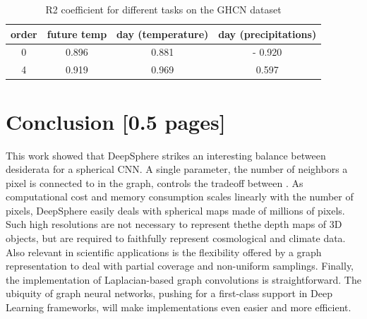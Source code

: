 \documentclass{article} %
\newcommand{\todo}[1]{{\color[rgb]{.6,.1,.6}{#1}}}
\begin{document}
\begin{table}
    \centering
    \begin{tabular}{c|ccc}
        order & future temp & day (temperature) & day (precipitations) \\ \hline
        0 & 0.896 & 0.881 & - 0.920\\
        4 & 0.919 & 0.969 & 0.597\\
    \end{tabular}
    \caption{R2 coefficient for different tasks on the GHCN dataset}
    \label{tab:GHCN_results}
\end{table}

\section{Conclusion [0.5 pages]}

This work showed that DeepSphere strikes an interesting balance between desiderata for a spherical CNN.
A single parameter, the number of neighbors a pixel is connected to in the graph, controls the tradeoff between \todo{performance and efficiency}.
As computational cost and memory consumption scales linearly with the number of pixels, DeepSphere easily deals with spherical maps made of millions of pixels.
Such high resolutions are not necessary to represent thethe  depth maps of 3D objects, but are required to faithfully represent cosmological and climate data.
Also relevant in scientific applications is the flexibility offered by a graph representation to deal with partial coverage and non-uniform samplings.
Finally, the implementation of Laplacian-based graph convolutions is straightforward.
The ubiquity of graph neural networks, pushing for a first-class support in Deep Learning frameworks, will make implementations even easier and more efficient.
\end{document}
